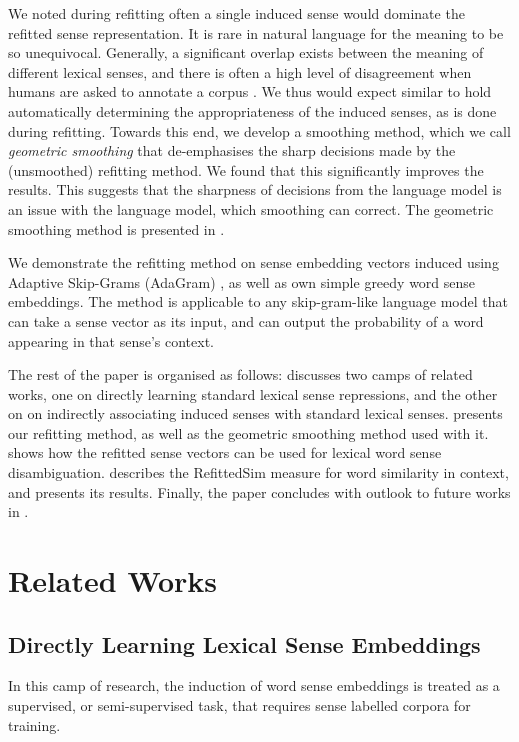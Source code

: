 \documentclass{sig-alternate}
\begin{document}
We noted during refitting often a single induced sense would dominate the refitted sense representation. It is rare in natural language for the meaning to be so unequivocal. Generally, a significant overlap exists between the meaning of different lexical senses, and there is often a high level of disagreement when humans are asked to annotate a corpus \parencite{veronis1998study}. We thus would expect similar to hold automatically determining the appropriateness of the induced senses, as is done during refitting. Towards this end, we develop a smoothing method, which we call \emph{geometric smoothing} that de-emphasises the sharp decisions made by the (unsmoothed) refitting method. We found that this significantly improves the results. This suggests that the sharpness of decisions from the language model is an issue with the language model, which smoothing can correct. The geometric smoothing method is presented in .


We demonstrate the refitting method on sense embedding vectors induced using Adaptive Skip-Grams (AdaGram) \parencite{AdaGrams}, as well as own simple greedy word sense embeddings. The method is applicable to any skip-gram-like language model that can take a sense vector as its input, and can output the probability of a word appearing in that sense's context.


The rest of the paper is organised as follows:  discusses two camps of related works, one on directly learning standard lexical sense repressions, and the other on on indirectly associating induced senses with standard lexical senses.  presents our refitting method, as well as the geometric smoothing method used with it.  shows how the refitted sense vectors can be used for lexical word sense disambiguation.  describes the RefittedSim measure for word similarity in context, and presents its results. Finally, the paper concludes with outlook to future works in .

\section{Related Works} \label{relatedwords}

\subsection{Directly Learning Lexical Sense Embeddings}
In this camp of research, the induction of word sense embeddings is treated as a supervised, or semi-supervised task, that requires sense labelled corpora for training.
\end{document}
